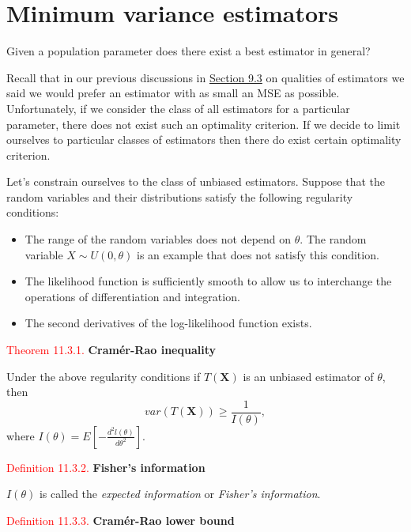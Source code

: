 \documentclass[
]{book}
\providecommand{\tightlist}{%
  \setlength{\itemsep}{0pt}\setlength{\parskip}{0pt}}
\begin{document}
\hypertarget{MLEprop:MVE}{%
\section{Minimum variance estimators}\label{MLEprop:MVE}}

Given a population parameter does there exist a best estimator in general?

Recall that in our previous discussions in \protect\hyperlink{paraestimate:judge}{Section 9.3} on qualities of estimators we said we would prefer an estimator with as small an MSE as possible. Unfortunately, if we consider the class of all estimators for a particular parameter, there does not exist such an optimality criterion. If we decide to limit ourselves to particular classes of estimators then there do exist certain optimality criterion.

Let's constrain ourselves to the class of unbiased estimators. Suppose that the random variables and their distributions satisfy the following regularity conditions:

\begin{itemize}
\tightlist
\item
  The range of the random variables does not depend on \(\theta\). The random variable \(X \sim U(0,\theta)\) is an example that does not satisfy this condition.\\
\item
  The likelihood function is sufficiently smooth to allow us to interchange the operations of differentiation and integration.\\
\item
  The second derivatives of the log-likelihood function exists.
\end{itemize}

\leavevmode{}%
\textcolor{red}{Theorem 11.3.1.}
{\textbf{Cramér-Rao inequality}}

Under the above regularity conditions if \(T(\mathbf{X})\) is an unbiased estimator of \(\theta\), then
\[var( T(\mathbf{X}) ) \geq \frac{1}{I(\theta)},\]
where \(I(\theta) = E \left[ - \frac{d^2 l(\theta)}{d\theta^2} \right]\).

\leavevmode{}%
\textcolor{red}{Definition 11.3.2.}
{\textbf{Fisher's information}}

\(I(\theta)\) is called the \emph{expected information} or \emph{Fisher's information}.

\leavevmode{}%
\textcolor{red}{Definition 11.3.3.}
{\textbf{Cramér-Rao lower bound}}
\end{document}
